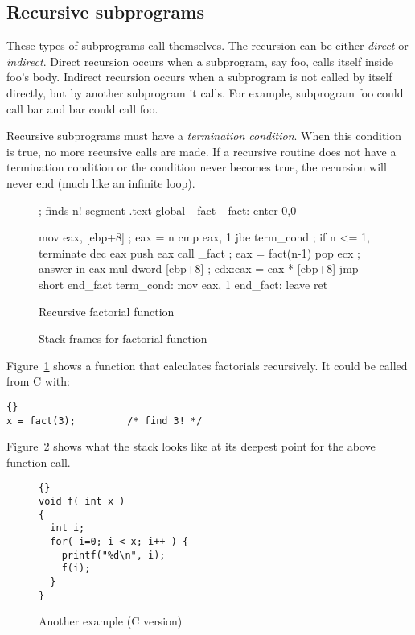 \subsection{Recursive subprograms}

These types of subprograms call themselves. The recursion can be either
\emph{direct} or \emph{indirect}. Direct recursion occurs when a subprogram,
say {\code foo}, calls itself inside {\code foo}'s body. Indirect recursion
occurs when a subprogram is not called by itself directly, but by another
subprogram it calls. For example, subprogram {\code foo} could call
{\code bar} and {\code bar} could call {\code foo}.

Recursive subprograms must have a \emph{termination condition}. When
this condition is true, no more recursive calls are made. If a
recursive routine does not have a termination condition or the condition
never becomes true, the recursion will never end (much like an infinite
loop).

\begin{figure}
\begin{AsmCodeListing}[frame=single]
; finds n!
segment .text
      global _fact
_fact:
      enter  0,0

      mov    eax, [ebp+8]    ; eax = n
      cmp    eax, 1
      jbe    term_cond       ; if n <= 1, terminate
      dec    eax
      push   eax
      call   _fact           ; eax = fact(n-1)
      pop    ecx             ; answer in eax
      mul    dword [ebp+8]   ; edx:eax = eax * [ebp+8]
      jmp    short end_fact
term_cond:
      mov    eax, 1
end_fact:
      leave
      ret
\end{AsmCodeListing}
\caption{Recursive factorial function\label{fig:factorial}}
\end{figure}

\begin{figure}
\centering

\caption{Stack frames for factorial function\label{fig:factStack}}
\end{figure}

Figure~\ref{fig:factorial} shows a function that calculates factorials
recursively. It could be called from C with:
\begin{lstlisting}[stepnumber=0]{}
x = fact(3);         /* find 3! */
\end{lstlisting}
Figure~\ref{fig:factStack} shows what the stack looks like at its deepest
point for the above function call.

\begin{figure}[t]
\begin{lstlisting}[frame=tlrb]{}
void f( int x )
{
  int i;
  for( i=0; i < x; i++ ) {
    printf("%d\n", i);
    f(i);
  }
}
\end{lstlisting}
\caption{Another example (C version)\label{fig:rec2C}}
\end{figure}

